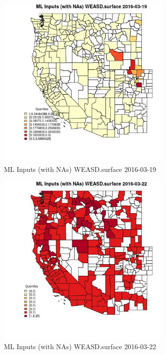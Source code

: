 \begin{figure} 
\centering  
\includegraphics[width=0.77\textwidth]{Code_Outputs/Report_ML_input_PM25_Step4_part_e_de_duplicated_aveswNAs_CountyWEASDsurfaceMean2016-03-19_2016-03-19.jpg} 
\caption{\label{fig:Report_ML_input_PM25_Step4_part_e_de_duplicated_aveswNAsCountyWEASDsurfaceMean2016-03-19_2016-03-19}ML Inputs (with NAs) WEASD.surface 2016-03-19} 
\end{figure} 
 

\clearpage 

\begin{figure} 
\centering  
\includegraphics[width=0.77\textwidth]{Code_Outputs/Report_ML_input_PM25_Step4_part_e_de_duplicated_aveswNAs_CountyWEASDsurfaceMean2016-03-22_2016-03-22.jpg} 
\caption{\label{fig:Report_ML_input_PM25_Step4_part_e_de_duplicated_aveswNAsCountyWEASDsurfaceMean2016-03-22_2016-03-22}ML Inputs (with NAs) WEASD.surface 2016-03-22} 
\end{figure} 
 

